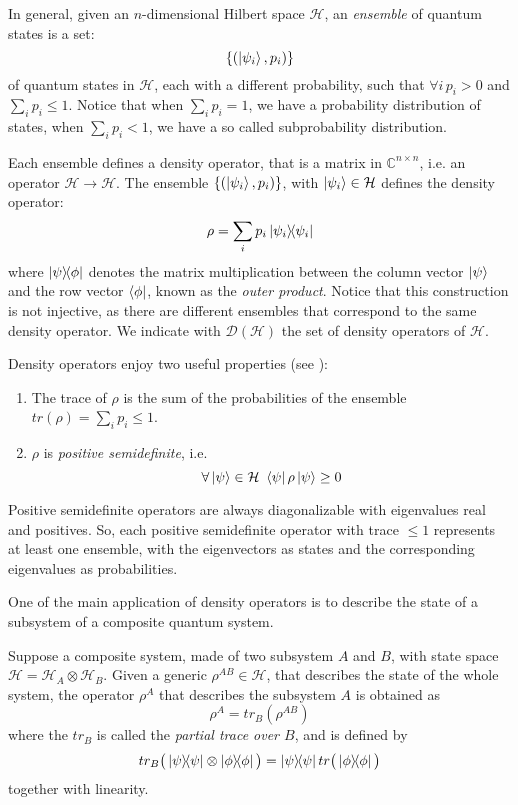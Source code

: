 \documentclass[10pt,a4paper, titlepage]{report}
\theoremstyle{definition}
\newcommand{\ketbra}[2]{\ket{#1}\!\!\bra{#2}}
\newcommand{\proj}[1]{\ketbra{#1}{#1}}
\newcommand{\kp}{\ket{\psi}}
\newcommand{\calH}{\mathcal{H}}
\newcommand{\calDH}{\mathcal{D}(\mathcal{H})}
\newcommand{\tensor}{\otimes}
\begin{document}
In general, given an $n$-dimensional Hilbert space $\calH$, an \textit{ensemble} of quantum states is a set:
\[\{(\ket{\psi_i}, p_i)\} \]
of quantum states in $\calH$, each with a different probability, such that $\forall i \, p_i > 0$ and $\sum_i p_i \leq 1$. Notice that when $\sum_i p_i = 1$, we have a probability distribution of states, when $\sum_i p_i < 1$, we have a so called subprobability distribution.

Each ensemble defines a density operator, that is a matrix in $\mathbb{C}^{n \times n}$, i.e. an operator $\calH \rightarrow \calH$. The ensemble $\{(\ket{\psi_i}, p_i)\}$, with $\ket{\psi_i} \in \calH$ defines the density operator: 
\[
	\rho = \sum_i p_i \proj{\psi_i}
\]
where $\ketbra{\psi}{\phi}$ denotes the matrix multiplication between the column vector $\kp$ and the row vector $\bra{\phi}$, known as the \textit{outer product}. Notice that this construction is not injective, as there are different ensembles that correspond to the same density operator. We indicate with $\calDH$ the set of density operators of $\calH$.

Density operators enjoy two useful properties (see \cite{nielsen_chuang_2010}): \begin{enumerate}
\item The trace of $\rho$ is the sum of the probabilities of the ensemble $tr(\rho) = \sum_i p_i \leq 1$.
\item $\rho$ is \textit{positive semidefinite}, i.e. 
\[\forall \kp \in \calH \ \bra{\psi}\rho\kp \geq 0\]
\end{enumerate}

Positive semidefinite operators are always diagonalizable with eigenvalues real and positives. So, each positive semidefinite operator with trace $\leq 1$ represents at least one ensemble, with the eigenvectors as states and the corresponding eigenvalues as probabilities.


One of the main application of density operators is to describe the state of a subsystem of a composite quantum system.

Suppose a composite system, made of two subsystem $A$ and $B$, with state space  $\calH = \calH_A \tensor \calH_B$.  Given a generic $\rho^{AB} \in \calH$, that describes the state of the whole system, the operator $\rho^A$ that describes the subsystem $A$ is obtained as 
\[
	\rho^A = tr_B(\rho^{AB})
\]
where the $tr_B$ is called the \textit{partial trace over $B$}, and is defined by 
\[
 tr_B\big(\proj{\psi} \tensor \proj{\phi}\big) = \proj{\psi}tr\big(\proj{\phi}\big)
\]
together with linearity.
\end{document}
